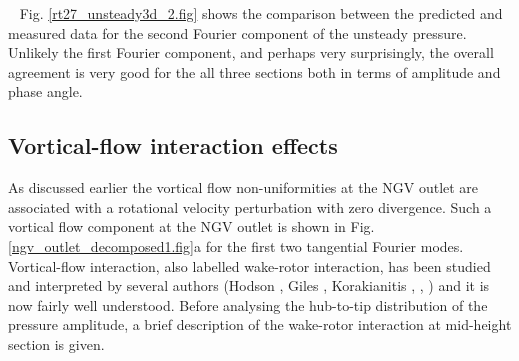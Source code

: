 ~\newline
 Fig. \ref{rt27_unsteady3d_2.fig} shows the comparison between
 the predicted and measured data for the second Fourier component of the
 unsteady pressure.
 Unlikely the first Fourier component, and perhaps very surprisingly,
 the overall agreement is very good for the all three sections
 both in terms of amplitude and phase angle.
%
%
%
%
%
\subsection{Vortical-flow interaction effects}
\label{rt27_vortical.subsec}
%
 As discussed earlier the vortical flow non-uniformities
 at the NGV outlet are associated with a rotational
 velocity perturbation with zero divergence.
 Such a vortical flow component at the NGV outlet is shown in
 Fig. \ref{ngv_outlet_decomposed1.fig}a for the first two
 tangential Fourier modes.
 Vortical-flow interaction, also labelled wake-rotor interaction,
 has been studied and interpreted by several authors
 (Hodson , Giles ,
 Korakianitis , ,
 ) and it is now fairly well understood.
 Before analysing the hub-to-tip distribution
 of the pressure amplitude, a brief description of the wake-rotor
 interaction at mid-height section is given.

